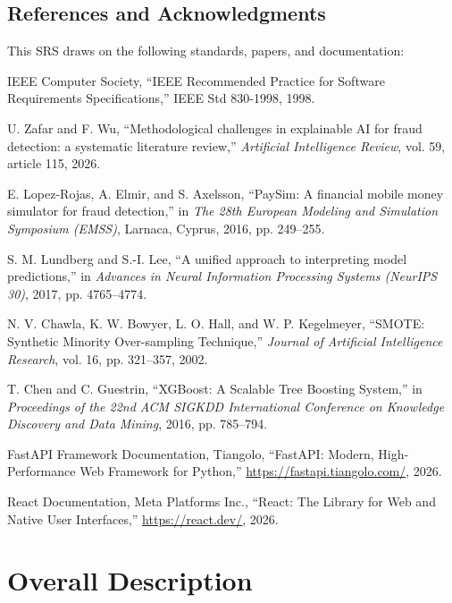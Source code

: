 \documentclass[12pt, a4paper]{report}
\begin{document}
\section{References and Acknowledgments}
This SRS draws on the following standards, papers, and documentation:
\begin{enumerate}[label={[\arabic*]}]
    \item IEEE Computer Society, ``IEEE Recommended Practice for Software Requirements Specifications,'' IEEE Std 830-1998, 1998.
    \item U. Zafar and F. Wu, ``Methodological challenges in explainable AI for fraud detection: a systematic literature review,'' \textit{Artificial Intelligence Review}, vol. 59, article 115, 2026.
    \item E. Lopez-Rojas, A. Elmir, and S. Axelsson, ``PaySim: A financial mobile money simulator for fraud detection,'' in \textit{The 28th European Modeling and Simulation Symposium (EMSS)}, Larnaca, Cyprus, 2016, pp. 249--255.
    \item S. M. Lundberg and S.-I. Lee, ``A unified approach to interpreting model predictions,'' in \textit{Advances in Neural Information Processing Systems (NeurIPS 30)}, 2017, pp. 4765--4774.
    \item N. V. Chawla, K. W. Bowyer, L. O. Hall, and W. P. Kegelmeyer, ``SMOTE: Synthetic Minority Over-sampling Technique,'' \textit{Journal of Artificial Intelligence Research}, vol. 16, pp. 321--357, 2002.
    \item T. Chen and C. Guestrin, ``XGBoost: A Scalable Tree Boosting System,'' in \textit{Proceedings of the 22nd ACM SIGKDD International Conference on Knowledge Discovery and Data Mining}, 2016, pp. 785--794.
    \item FastAPI Framework Documentation, Tiangolo, ``FastAPI: Modern, High-Performance Web Framework for Python,'' \url{https://fastapi.tiangolo.com/}, 2026.
    \item React Documentation, Meta Platforms Inc., ``React: The Library for Web and Native User Interfaces,'' \url{https://react.dev/}, 2026.
\end{enumerate}

\newpage

\chapter{Overall Description}
\end{document}
